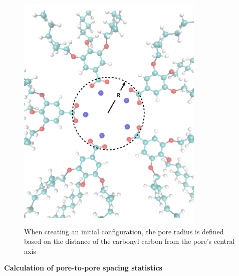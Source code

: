 \documentclass{article}
\begin{document}
  \begin{figure}
	\centering
	\includegraphics[width=0.8\textwidth]{pore_radius_illustration.png}
	\caption{When creating an initial configuration, the pore radius is defined based
	on the distance of the carbonyl carbon from the pore's central axis}
	\label{fig:pore_radius_illustration}
  \end{figure}

  \noindent
  \begingroup
        \fontsize{14pt}{14pt}\selectfont
	\textbf{Calculation of pore-to-pore spacing statistics}
  \endgroup
 
\end{document}
